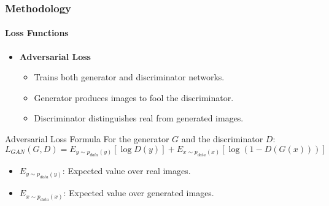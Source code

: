 \documentclass[aspectratio=169, lecture, amberg]{OTHAWbeamer}
\begin{document}
\begin{frame}[t]
    \frametitle{Methodology}
    \framesubtitle{Loss Functions}

    \begin{itemize}
        \item \textbf{Adversarial Loss}
        \begin{itemize}
            \item Trains both generator and discriminator networks.
            \item Generator produces images to fool the discriminator.
            \item Discriminator distinguishes real from generated images.
        \end{itemize}
    \end{itemize}

    \begin{block}{Adversarial Loss Formula}
    \small
    For the generator \(G\) and the discriminator \(D\):
    \[
    L_{GAN}(G,D) = E_{y \sim p_{data}(y)} [\log D(y)] + E_{x \sim p_{data}(x)} [\log (1 - D(G(x)))]
    \]
    \vspace{-0.6cm}
    \begin{itemize}
        \item \(E_{y \sim p_{data}(y)}\): Expected value over real images.
        \item \(E_{x \sim p_{data}(x)}\): Expected value over generated images.
        
    \end{itemize}
    \end{block}

\end{frame}
\end{document}
